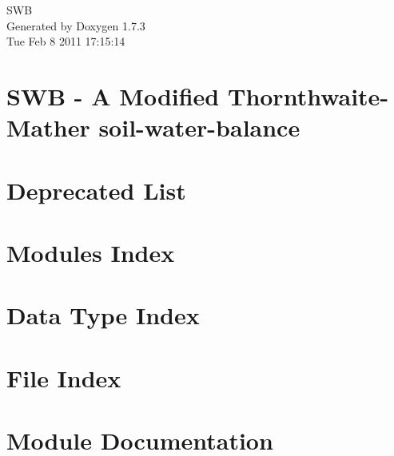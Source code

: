 \documentclass[letterpaper]{book}
\begin{document}
\hypersetup{pageanchor=false}
\begin{titlepage}
\vspace*{7cm}
\begin{center}
{\Large SWB }\\
\vspace*{1cm}
{\large Generated by Doxygen 1.7.3}\\
\vspace*{0.5cm}
{\small Tue Feb 8 2011 17:15:14}\\
\end{center}
\end{titlepage}
\clearemptydoublepage
{}
\tableofcontents
\clearemptydoublepage
{}
\hypersetup{pageanchor=true}
\chapter{SWB -\/ A Modified Thornthwaite-\/Mather soil-\/water-\/balance}
\label{index}\hypertarget{index}{}
\chapter{Deprecated List}
\label{deprecated}
\hypertarget{deprecated}{}

\chapter{Modules Index}

\chapter{Data Type Index}

\chapter{File Index}

\chapter{Module Documentation}



















\end{document}
